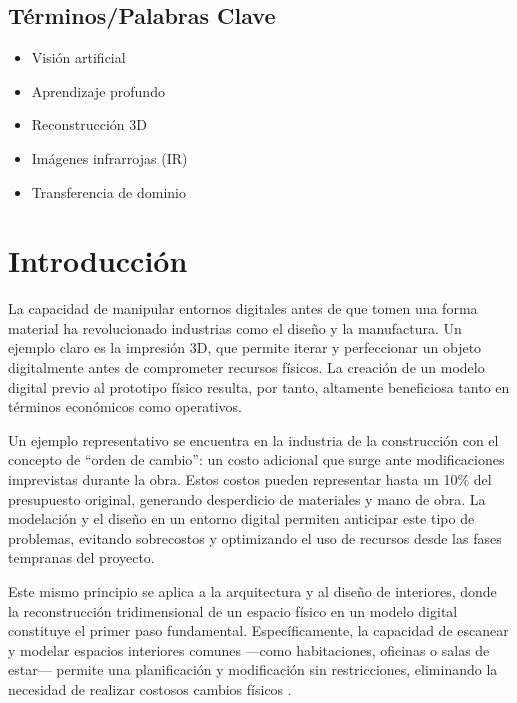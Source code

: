 \documentclass[12pt, a4, twoside, openany]{report}
\begin{document}
\section*{Términos/Palabras Clave}

\begin{itemize}
    \item Visión artificial
    \item Aprendizaje profundo
    \item Reconstrucción 3D
    \item Imágenes infrarrojas (IR)
    \item Transferencia de dominio
\end{itemize}
\tableofcontents

\newpage
\renewcommand{\thepage}{\arabic{page}}
\setcounter{page}{1}
\pagestyle{fancy} 
\fancyhead[LE,RO]{\rightmark}
\fancyhead[RE,LO]{}


\chapter{Introducción}

La capacidad de manipular entornos digitales antes de que tomen una forma material ha revolucionado industrias como el diseño y la manufactura. Un ejemplo claro es la impresión 3D, que permite iterar y perfeccionar un objeto digitalmente antes de comprometer recursos físicos. La creación de un modelo digital previo al prototipo físico resulta, por tanto, altamente beneficiosa tanto en términos económicos como operativos.

Un ejemplo representativo se encuentra en la industria de la construcción con el concepto de ``orden de cambio'': un costo adicional que surge ante modificaciones imprevistas durante la obra. Estos costos pueden representar hasta un 10\% del presupuesto original, generando desperdicio de materiales y mano de obra. La modelación y el diseño en un entorno digital permiten anticipar este tipo de problemas, evitando sobrecostos y optimizando el uso de recursos desde las fases tempranas del proyecto.

Este mismo principio se aplica a la arquitectura y al diseño de interiores, donde la reconstrucción tridimensional de un espacio físico en un modelo digital constituye el primer paso fundamental. Específicamente, la capacidad de escanear y modelar espacios interiores comunes ---como habitaciones, oficinas o salas de estar--- permite una planificación y modificación sin restricciones, eliminando la necesidad de realizar costosos cambios físicos \cite{app15126681}.
\end{document}
